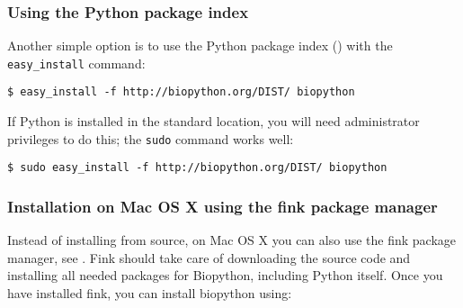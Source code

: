 \documentclass{article}
\begin{document}
\subsubsection{Using the Python package index}

Another simple option is to use the Python package index
() with the \verb|easy_install|
command:

\begin{verbatim}
$ easy_install -f http://biopython.org/DIST/ biopython
\end{verbatim}

If Python is installed in the standard location, you will need administrator
privileges to do this; the \verb|sudo| command works well:

\begin{verbatim}
$ sudo easy_install -f http://biopython.org/DIST/ biopython
\end{verbatim}

% 
% 
% 
% 

\subsubsection{Installation on Mac OS X using the fink package manager}

Instead of installing from source, on Mac OS X you can also use the fink package manager, see . Fink should take care of downloading the source code and installing all needed packages for Biopython, including Python itself. Once you have installed fink, you can install biopython using:
\end{document}
